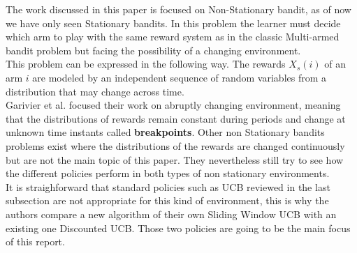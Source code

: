 The work discussed in this paper is focused on Non-Stationary bandit, as of now we have only seen Stationary bandits. In this problem the learner must decide which arm to play with the same reward system as in the classic Multi-armed bandit problem but facing the possibility of a changing environment.\\

This problem can be expressed in the following way. The rewards $X_s(i)$ of an arm $i$ are modeled by an independent sequence of random variables from a distribution that may change across time.\\

Garivier et al. focused their work on abruptly changing environment, meaning that the distributions of rewards remain constant during periods and change at unknown time instants called \textbf{breakpoints}. Other non Stationary bandits problems exist where the distributions of the rewards are changed continuously but are not the main topic of this paper. They nevertheless still try to see how the different policies perform in both types of non stationary environments.\\

It is straighforward that standard policies such as UCB reviewed in the last subsection are not appropriate for this kind of environment, this is why the authors compare a new algorithm of their own Sliding Window UCB with an existing one Discounted UCB. Those two policies are going to be the main focus of this report.